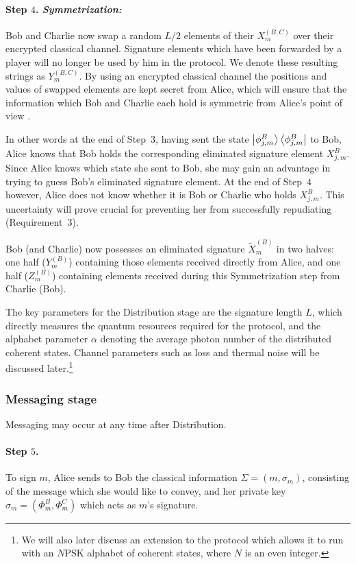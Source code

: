 \paragraph{Step $4$. \emph{Symmetrization:}}
Bob and Charlie now swap a random $L/2$ elements of their $X_m^{\left(B, C\right)}$ over their encrypted classical channel. Signature elements which have been forwarded by a player will no longer be used by him in the protocol. We denote these resulting strings as $Y_m^{\left(B, C\right)}$. By using an encrypted classical channel the positions and values of swapped elements are kept secret from Alice, which will ensure that the information which Bob and Charlie each hold is symmetric from Alice's point of view \cite{Dunjko2014, Wallden2015}. 

In other words at the end of Step~$3$, having sent the state $\ket{\phi_{j, m}^B}\bra{\phi_{j, m}^B}$ to Bob, Alice knows that Bob holds the corresponding eliminated signature element $X_{j, m}^B$. Since Alice knows which state she sent to Bob, she may gain an advantage in trying to guess Bob's eliminated signature element. At the end of Step~$4$ however, Alice does not know whether it is Bob or Charlie who holds $X_{j, m}^B$. This uncertainty will prove crucial for preventing her from successfully repudiating (Requirement~$3$). 

Bob (and Charlie) now possesses an eliminated signature $\tilde{X}_m^{\left(B\right)}$ in two halves: one half ($Y_m^{\left(B\right)}$) containing those elements received directly from Alice, and one half ($Z_m^{\left(B\right)}$) containing elements received during this Symmetrization step from Charlie (Bob).

The key parameters for the Distribution stage are the signature length $L$, which directly measures the quantum resources required for the protocol, and the alphabet parameter $\alpha$ denoting the average photon number of the distributed coherent states. Channel parameters such as loss and thermal noise will be discussed later.\footnote{We will also later discuss an extension to the protocol which allows it to run with an $N$PSK alphabet of coherent states, where $N$ is an even integer.}

\subsubsection{Messaging stage}

Messaging may occur at any time after Distribution.

\paragraph{Step $5$.}
To sign $m$, Alice sends to Bob the classical information $\Sigma = \left(m, \sigma_m\right)$, consisting of the message which she would like to convey, and her private key $\sigma_m = \left(\Phi_m^B, \Phi_m^C\right)$ which acts as $m$'s signature. 


